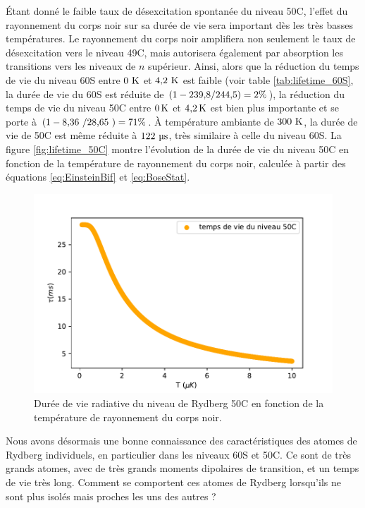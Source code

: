 Étant donné le faible taux de désexcitation spontanée du niveau 50C, l'effet du rayonnement du corps noir sur sa durée de vie sera important dès les très basses températures.
Le rayonnement du corps noir amplifiera non seulement le taux de désexcitation vers le niveau 49C, mais autorisera également par absorption les transitions vers les niveaux de $n$ supérieur.
Ainsi, alors que la réduction du temps de vie du niveau 60S entre $\numv{0}\si{\kelvin}$ et $\numv{4.2}\si{\kelvin}$ est faible (voir table \ref{tab:lifetime_60S}, la durée de vie du 60S est réduite de $(1-\numvv{239.8}/\numvv{244.5}) = 2\%$), la réduction du temps de vie du niveau 50C entre $\SIvv{0}{\K}$ et $\SIvv{4.2}{\K}$ est bien plus importante et se porte à $(1-\numv{8.36}/\numv{28.65}) = 71\%$.
\`A température ambiante de $\numv{300}\si{\kelvin}$, la durée de vie de 50C est même réduite à $\numv{122}\si{\micro\second}$, très similaire à celle du niveau 60S.
La figure \eqref{fig:lifetime_50C} montre l'évolution de la durée de vie du niveau 50C en fonction de la température de rayonnement du corps noir, calculée à partir des équations \eqref{eq:EinsteinBif} et \eqref{eq:BoseStat}.


\begin{figure}[!h]
	\centering
	\includegraphics[width=0.6\linewidth]{figures/lifetime_50C}
	\caption[Durée de vie du niveau 50C]{Durée de vie radiative du niveau de Rydberg 50C en fonction de la température de rayonnement du corps noir.}
	\label{fig:lifetime_50C}
\end{figure}


\bigskip

Nous avons désormais une bonne connaissance des caractéristiques des atomes de Rydberg individuels, en particulier dans les niveaux 60S et 50C.
Ce sont de très grands atomes, avec de très grands moments dipolaires de transition, et un temps de vie très long.
Comment se comportent ces atomes de Rydberg lorsqu'ils ne sont plus isolés mais proches les uns des autres ?

